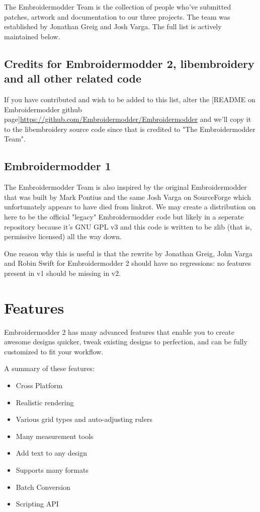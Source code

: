 \documentclass{report}
\begin{document}
The Embroidermodder Team is the collection of people who've submitted
patches, artwork and documentation to our three projects.
The team was established by Jonathan Greig and Josh Varga.
The full list is actively maintained below.

\section{Credits for Embroidermodder 2, libembroidery and all other related code}

If you have contributed and wish to be added to this list, alter the [README on Embroidermodder github page]\url{https://github.com/Embroidermodder/Embroidermodder} and we'll copy it to the libembroidery source code since that is credited to "The Embroidermodder Team".

\section{Embroidermodder 1}

The Embroidermodder Team is also inspired by the original Embroidermodder that was built by Mark Pontius and the same Josh Varga on SourceForge which unfortunately appears to have died from linkrot. We may create a distribution on here to be the official "legacy" Embroidermodder code but likely in a seperate repository because it's GNU GPL v3 and this code is written to be zlib (that is, permissive licensed) all the way down.

One reason why this is useful is that the rewrite by Jonathan Greig, John Varga and Robin Swift for Embroidermodder 2 should have no regressions: no features present in v1 should be missing in v2.

\chapter{Features}

Embroidermodder 2 has many advanced features that enable you to create awesome designs quicker, tweak existing designs to perfection, and can be fully customized to fit your workflow.

A summary of these features:

\begin{itemize}
\item Cross Platform
\item Realistic rendering
\item Various grid types and auto-adjusting rulers
\item Many measurement tools
\item Add text to any design
\item Supports many formats
\item Batch Conversion
\item Scripting API
\end{itemize}
\end{document}
